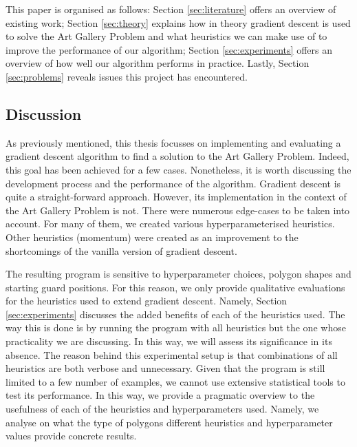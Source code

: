 This paper is organised as follows: Section \ref{sec:literature} offers an overview of existing work; Section \ref{sec:theory} explains how in theory gradient descent is used to solve the Art Gallery Problem and what heuristics we can make use of to improve the performance of our algorithm; Section \ref{sec:experiments} offers an overview of how well our algorithm performs in practice. Lastly, Section \ref{sec:problems} reveals issues this project has encountered.

\subsection{Discussion}
As previously mentioned, this thesis focusses on implementing and evaluating a gradient descent algorithm to find a solution to the Art Gallery Problem. Indeed, this goal has been achieved for a few cases. 
Nonetheless, it is worth discussing the development process and the performance of the algorithm. Gradient descent is quite a straight-forward approach. However, its implementation in the context of the Art Gallery Problem is not. There were numerous edge-cases to be taken into account. For many of them, we created various hyperparameterised heuristics. Other heuristics (momentum) were created as an improvement to the shortcomings of the vanilla version of gradient descent.

The resulting program is sensitive to hyperparameter choices, polygon shapes and starting guard positions. For this reason, we only provide qualitative evaluations for the heuristics used to extend gradient descent. Namely, Section \ref{sec:experiments} discusses the added benefits of each of the heuristics used. The way this is done is by running the program with all heuristics but the one whose practicality we are discussing. In this way, we will assess its significance in its absence. The reason behind this experimental setup is that combinations of all heuristics are both verbose and unnecessary. Given that the program is still limited to a few number of examples, we cannot use extensive statistical tools to test its performance.
In this way, we provide a pragmatic overview to the usefulness of each of the heuristics and hyperparameters used. Namely, we analyse on what the type of polygons different heuristics and hyperparameter values provide concrete results.

